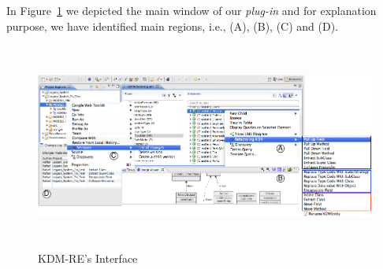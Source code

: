 In Figure~\ref{fig:interface} we depicted the main window of our \textit{plug-in} and for explanation purpose, we have identified main regions, i.e., (A), (B), (C) and (D).

\begin{figure}[!ht]
\centering
  \includegraphics[width=15cm, height=6.8cm]{figure/ScreenShot_tool}
\caption{KDM-RE's Interface}
\label{fig:interface}
\end{figure}